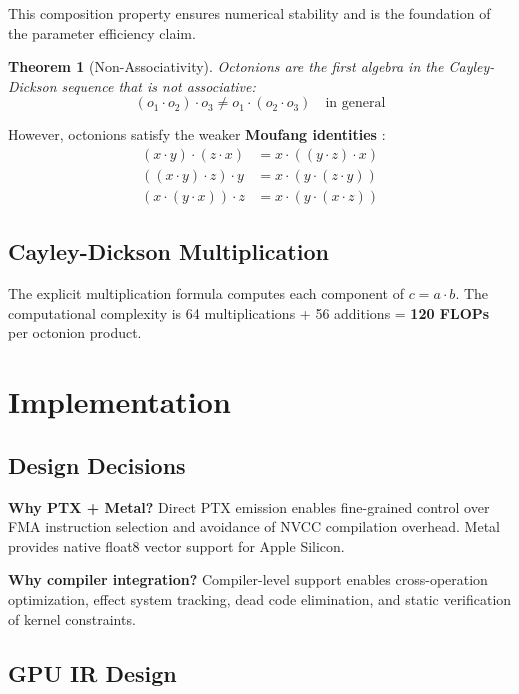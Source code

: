 \documentclass[11pt,a4paper]{article}
\newtheorem{theorem}{Theorem}
\begin{document}
This composition property ensures numerical stability and is the foundation of the parameter efficiency claim.

\begin{theorem}[Non-Associativity]
Octonions are the first algebra in the Cayley-Dickson sequence that is not associative:
\[
(o_1 \cdot o_2) \cdot o_3 \neq o_1 \cdot (o_2 \cdot o_3) \quad \text{in general}
\]
\end{theorem}

However, octonions satisfy the weaker \textbf{Moufang identities} \cite{moufang1935}:
\begin{align}
(x \cdot y) \cdot (z \cdot x) &= x \cdot ((y \cdot z) \cdot x) \tag{M1} \\
((x \cdot y) \cdot z) \cdot y &= x \cdot (y \cdot (z \cdot y)) \tag{M2} \\
(x \cdot (y \cdot x)) \cdot z &= x \cdot (y \cdot (x \cdot z)) \tag{M3}
\end{align}

\subsection{Cayley-Dickson Multiplication}

The explicit multiplication formula computes each component of $c = a \cdot b$. The computational complexity is 64 multiplications + 56 additions = \textbf{120 FLOPs} per octonion product.

\section{Implementation}
\label{sec:implementation}

\subsection{Design Decisions}

\textbf{Why PTX + Metal?} Direct PTX emission enables fine-grained control over FMA instruction selection and avoidance of NVCC compilation overhead. Metal provides native float8 vector support for Apple Silicon.

\textbf{Why compiler integration?} Compiler-level support enables cross-operation optimization, effect system tracking, dead code elimination, and static verification of kernel constraints.

\subsection{GPU IR Design}
\end{document}
